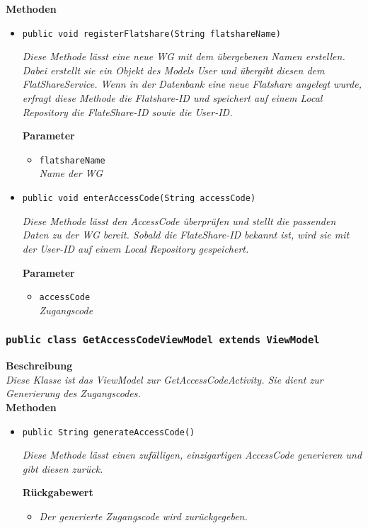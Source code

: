 		\textbf{Methoden}
 			\begin{itemize}
        		\item{\texttt{public void registerFlatshare(String flatshareName)}}
        	
        		\textit{Diese Methode lässt eine neue WG mit dem übergebenen Namen erstellen. Dabei erstellt sie ein Objekt des Models User und übergibt diesen dem FlatShareService. Wenn in der Datenbank eine neue Flatshare angelegt wurde, erfragt diese Methode die Flatshare-ID und speichert auf einem Local Repository die FlateShare-ID sowie die User-ID.}
        
        \textbf{Parameter}
        		\begin{itemize}
        			\item\texttt{flatshareName}\\ 
        			\textit{Name der WG}
        		\end{itemize}
        	
        		\item{\texttt{public void enterAccessCode(String accessCode)}}
        	
        		\textit{Diese Methode lässt den AccessCode überprüfen und stellt die passenden Daten zu der WG bereit. Sobald die FlateShare-ID bekannt ist, wird sie mit der User-ID auf einem Local Repository gespeichert.}
        	
        		\textbf{Parameter}
        		\begin{itemize}
        			\item\texttt{accessCode}\\
        			\textit{Zugangscode}
        		\end{itemize}
        	
        \end{itemize}
   
   
   
        \subsubsection{\texttt{public class GetAccessCodeViewModel extends ViewModel}}
        \textbf{Beschreibung} \\
        \textit{Diese Klasse ist das ViewModel zur GetAccessCodeActivity. Sie dient zur Generierung des Zugangscodes.}\\
        
		\textbf{Methoden}
 			\begin{itemize}
        		\item{\texttt{public String generateAccessCode()}}
        	
        		\textit{Diese Methode lässt einen zufälligen, einzigartigen AccessCode generieren und gibt diesen zurück.}
        	
        \textbf{Rückgabewert}
        	\begin{itemize}
        		\item\textit{Der generierte Zugangscode wird zurückgegeben.}
        	\end{itemize}
        
        
  	  \end{itemize}
       		 
